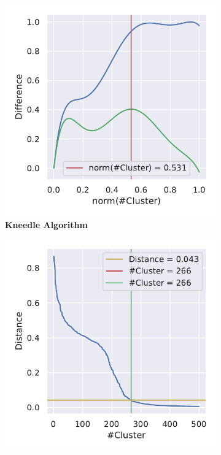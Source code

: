 \begin{figure}
    \begin{adjustbox}{minipage=\dimexpr{}\fboxrule,fbox}
        \begin{subfigure}[b]{0.475\textwidth}
            \includegraphics[width=\textwidth]{UMAP/Cluster_Knee_Segment_4.pdf}
            \caption[Kneedle Algorithm]{\textbf{Kneedle Algorithm}}
            \label{subfig:UMAP_Cluster_Knee_Kneedle_4}
        \end{subfigure}
        \hfill
        \begin{subfigure}[b]{0.475\textwidth}
            \includegraphics[width=\textwidth]{UMAP/Cluster_Elbow_Knee_Segment_4.pdf}

\end{subfigure}
\end{adjustbox}
\end{figure}
